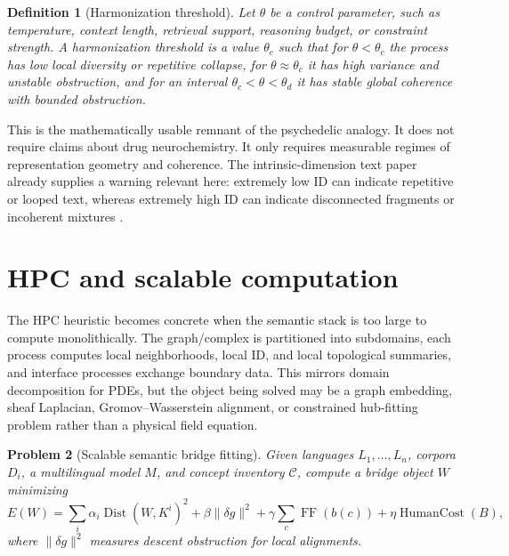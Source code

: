 \documentclass[11pt]{article}
\newtheorem{definition}{Definition}[section]
\newtheorem{problem}[definition]{Problem}
\newcommand{\Concept}{\mathcal C}
\newcommand{\FF}{\operatorname{FF}}
\newcommand{\Dist}{\operatorname{Dist}}
\begin{document}
\begin{definition}[Harmonization threshold]
Let $\theta$ be a control parameter, such as temperature, context length, retrieval support, reasoning budget, or constraint strength.  A harmonization threshold is a value $\theta_c$ such that for $\theta<\theta_c$ the process has low local diversity or repetitive collapse, for $\theta\approx\theta_c$ it has high variance and unstable obstruction, and for an interval $\theta_c<\theta<\theta_d$ it has stable global coherence with bounded obstruction.
\end{definition}

This is the mathematically usable remnant of the psychedelic analogy.  It does not require claims about drug neurochemistry.  It only requires measurable regimes of representation geometry and coherence.  The intrinsic-dimension text paper already supplies a warning relevant here: extremely low ID can indicate repetitive or looped text, whereas extremely high ID can indicate disconnected fragments or incoherent mixtures \cite{Pedashenko2025}.

\section{HPC and scalable computation}

The HPC heuristic becomes concrete when the semantic stack is too large to compute monolithically.  The graph/complex is partitioned into subdomains, each process computes local neighborhoods, local ID, and local topological summaries, and interface processes exchange boundary data.  This mirrors domain decomposition for PDEs, but the object being solved may be a graph embedding, sheaf Laplacian, Gromov--Wasserstein alignment, or constrained hub-fitting problem rather than a physical field equation.

\begin{problem}[Scalable semantic bridge fitting]
Given languages $L_1,
\dots,L_n$, corpora $D_i$, a multilingual model $M$, and concept inventory $\Concept$, compute a bridge object $W$ minimizing
\[
  E(W)=
  \sum_i \alpha_i\Dist(W,K^i)^2
  +\beta\|\delta g\|^2
  +\gamma\sum_c \FF(b(c))
  +\eta\operatorname{HumanCost}(B),
\]
where $\|\delta g\|^2$ measures descent obstruction for local alignments.
\end{problem}
\end{document}
